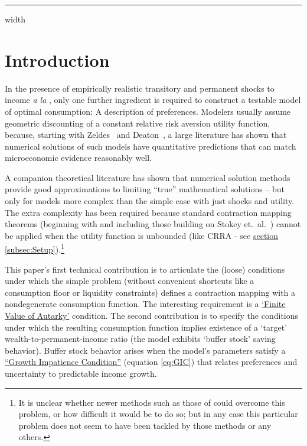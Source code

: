 \documentclass[BufferStockTheory]{subfiles}
\begin{document}


\hrule height 0.4pt depth 0.0pt width \textwidth \relax

\medskip \medskip

\hypertarget{Introduction}{}
\section{Introduction}

\label{sec:intro}

In the presence of empirically realistic transitory and permanent shocks to income \textit{a la} \cite{friedmanATheory}, only one further ingredient is required to construct a testable model of optimal consumption: A description of preferences.  Modelers usually assume geometric discounting of a constant relative risk aversion utility function, because, starting with Zeldes~\citeyearpar{zeldesStochastic} and Deaton~\citeyearpar{deatonLiqConstr}, a large literature has shown that numerical solutions of such models have quantitative predictions that can match microeconomic evidence reasonably well.

A companion theoretical literature has shown that numerical solution methods provide good approximations to limiting ``true'' mathematical solutions -- but only for models more complex than the simple case with just shocks and utility.  The extra complexity has been required because standard contraction mapping theorems (beginning with \cite{bellmanDynamicProgramming} and including those building on Stokey et.~al.~\citeyearpar{slpMethods}) cannot be applied when the utility function is unbounded (like CRRA - see \hyperlink{DiffFromLit}{section \ref{subsec:Setup}}).\footnote{It is unclear whether newer methods such as those of \cite{mnUnique} could overcome this problem, or how difficult it would be to do so; but in any case this particular problem does not seem to have been tackled by those methods or any others.}

This paper's first technical contribution is to articulate the (loose) conditions under which the simple problem (without convenient shortcuts like a consumption floor or liquidity constraints) defines a contraction mapping with a nondegenerate consumption function.  The interesting requirement is a \hyperlink{FVAC}{`Finite Value of Autarky'} condition.  The second contribution is to specify the conditions under which the resulting consumption function implies existence of a `target' wealth-to-permanent-income ratio (the model exhibits `buffer stock' saving behavior).  Buffer stock behavior arises when the model's parameters satisfy a \hyperlink{GIC}{``Growth Impatience Condition''} (equation \eqref{eq:GIC}) that relates preferences and uncertainty to predictable income growth.
\end{document}
